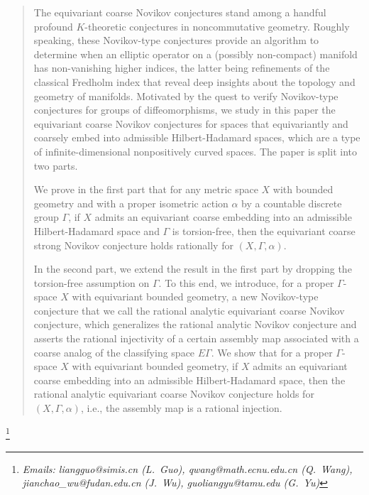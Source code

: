 \documentclass[11pt]{article}
\theoremstyle{definition}
\theoremstyle{plain}
\newcommand\blfootnote[1]{%
\begingroup \renewcommand\thefootnote{}\footnote{#1}%
\addtocounter{footnote}{-1}%
\endgroup }
\begin{document}
\begin{abstract}
	The equivariant coarse Novikov conjectures stand among a handful profound $K$-theoretic conjectures in noncommutative geometry. 
	Roughly speaking, these Novikov-type conjectures provide an algorithm to determine when an elliptic operator on a (possibly non-compact) manifold has non-vanishing higher indices, the latter being refinements of the classical Fredholm index that reveal deep insights about the topology and geometry of manifolds. 
Motivated by the quest to verify Novikov-type conjectures for groups of diffeomorphisms, we study in this paper the equivariant coarse Novikov conjectures for spaces that equivariantly and coarsely embed into admissible Hilbert-Hadamard spaces, which are a type of infinite-dimensional nonpositively curved spaces. The paper is split into two parts.

We prove in the first part that for any metric space $X$ with bounded geometry and with a proper isometric action $\alpha$ by a countable discrete group $\Gamma$, if $X$ admits an equivariant coarse embedding into an admissible Hilbert-Hadamard space and $\Gamma$ is torsion-free, then the equivariant coarse strong Novikov conjecture holds rationally for $(X, \Gamma, \alpha)$.

In the second part, we extend the result in the first part by dropping the torsion-free assumption on $\Gamma$. To this end, we introduce, 
for a proper $\Gamma$-space $X$ with equivariant bounded geometry, 
a new Novikov-type conjecture that we call the rational analytic equivariant coarse Novikov conjecture, which generalizes the rational analytic Novikov conjecture and asserts the rational injectivity of a certain assembly map associated with a coarse analog of the classifying space $E\Gamma$. We show that for a proper $\Gamma$-space $X$ with equivariant bounded geometry, if $X$ admits an equivariant coarse embedding into an admissible Hilbert-Hadamard space, then the rational analytic equivariant coarse Novikov conjecture holds for $(X,\Gamma,\alpha)$, i.e., the assembly map is a rational injection.
\end{abstract}


\blfootnote{\emph{Emails: {liangguo@simis.cn (L.~Guo)}, {qwang@math.ecnu.edu.cn (Q.~Wang)}, {jianchao\_wu@fu\-dan.edu.cn (J.~Wu)}, {guoliangyu@tamu.edu (G.~Yu)}}}



\begin{spacing}{0.1}
{\tableofcontents}
\end{spacing}
\end{document}
